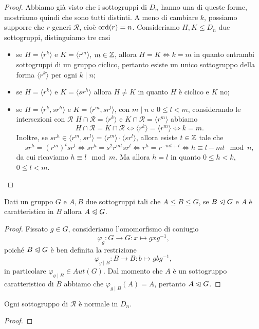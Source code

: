 \documentclass[11pt]{scrartcl}
\begin{document}
\begin{proof}
    Abbiamo già visto che i sottogruppi di $D_n$ hanno una di queste forme, 
    mostriamo quindi che sono tutti distinti. A meno di cambiare $k$, possiamo
    supporre che $r$ generi $\mathcal{R}$, cioè $\operatorname{ord}(r) = n$. 
    Consideriamo $H, K\leq D_n$ due sottogruppi, distinguiamo tre casi 
    \begin{itemize}
        \item se $H = \langle r^k\rangle$ e $K = \langle r^m\rangle$, $m \in \mathbb Z$,
        allora $H = K\iff k = m$ in quanto entrambi sottogruppi di un gruppo 
        ciclico, pertanto esiste un unico sottogruppo della forma $\langle r^k\rangle$
        per ogni $k \mid n$;
        \item se $H = \langle r^k\rangle$ e $K = \langle sr^h\rangle$ allora $H \neq K$
        in quanto $H$ è ciclico e $K$ no;
        \item se $H = \langle r^k, sr^h\rangle$ e $K = \langle r^m, sr^l\rangle$, 
        con $m \mid n$ e $0\leq l < m$, considerando le intersezioni con $\mathcal{R}$ 
        $H \cap \mathcal{R} = \langle r^k\rangle$ e $K \cap \mathcal{R} = \langle r^m\rangle$ 
        abbiamo \[
        H \cap \mathcal{R} = K\cap\mathcal{R} \iff \langle r^k\rangle = \langle r^m\rangle
        \iff k = m.
        \] Inoltre, se $sr^h \in \langle r^m, sr^l\rangle = \langle r^m\rangle
        \cdot \langle sr^l\rangle$, allora esiste $t \in \mathbb Z$ tale che \[
        sr^h = (r^m)^t sr^l \iff sr^h = s^2r^{mt}sr^l \iff r^h = r^{-mt + l}
        \iff h \equiv l - mt \mod n,
        \]da cui ricaviamo $h \equiv l \mod m$. Ma allora $h =l$ in quanto 
        $0 \leq h < k$, $0\leq l < m$.
    \end{itemize}
\end{proof}

\begin{lemma}
    Dati un gruppo $G$ e $A, B$ due sottogruppi tali che $A \leq B \leq G$,
    se $B\trianglelefteqslant G$ e $A$ è caratteristico in $B$ allora 
    $A \trianglelefteqslant G$.
\end{lemma}

\begin{proof}
    Fissato $g \in G$, consideriamo l'omomorfismo di coniugio 
    \[
        \varphi_g : G\longrightarrow G : x\longmapsto gxg^{-1},
    \] poiché 
    $B\trianglelefteqslant G$ è ben definita la restrizione \[
        \varphi_{g\mid B} : B\longrightarrow B :  b \longmapsto gbg^{-1},
    \]in particolare $\varphi_{g\mid B} \in Aut(G)$. Dal momento che $A$ è
    un sottogruppo caratteristico di $B$ abbiamo che $\varphi_{g\mid B}(A) = A$,
    pertanto $A \trianglelefteqslant G$.
\end{proof}


\begin{corollary}
    Ogni sottogruppo di $\mathcal{R}$ è normale in $D_n$.
\end{corollary}

\begin{proof}
    
\end{proof}
\end{document}
